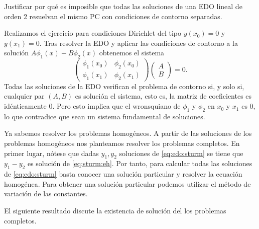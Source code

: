 \documentclass{article}
\begin{document}
\begin{ex}
  Justificar por qué es imposible que todas las soluciones de una EDO lineal de orden 2 resuelvan el
  mismo PC con condiciones de contorno separadas.

  Realizamos el ejercicio para condiciones Dirichlet del tipo $y(x_0) = 0$ y $y(x_1) = 0$. Tras
  resolver la EDO y aplicar las condiciones de contorno a la solución $A \phi_1(x)+B\phi_2(x)$
  obtenemos el sistema
  \[
    \left(
      \begin{matrix}
        \phi_1(x_0) & \phi_2(x_0) \\
        \phi_1(x_1) & \phi_2(x_1)
      \end{matrix}
    \right) \left(
      \begin{matrix}
        A \\
        B
      \end{matrix}
    \right) = 0.
  \]
  Todas las soluciones de la EDO verifican el problema de contorno si, y solo si, cualquier par
  $(A,B)$ es solución el sistema, esto es, la matriz de coeficientes es idénticamente $0$. Pero esto
  implica que el wronsquiano de $\phi_1$ y $\phi_2$ en $x_0$ y $x_1$ es $0$, lo que contradice que
  sean un sistema fundamental de soluciones.
\end{ex}

Ya sabemos resolver los problemas homogéneos. A partir de las soluciones de los problemas homogéneos
nos planteamos resolver los problemas completos. En primer lugar, nótese que dadas $y_1, y_2$
soluciones de \eqref{eq:edo:sturm} se tiene que $y_1-y_2$ es solución de \eqref{eq:sturm:eh}.  Por
tanto, para calcular todas las soluciones de \eqref{eq:edo:sturm} basta conocer una solución
particular y resolver la ecuación homogénea. Para obtener una solución particular podemos utilizar
el método de variación de las constantes.

El siguiente resultado discute la existencia de solución del los problemas completos.
\end{document}
